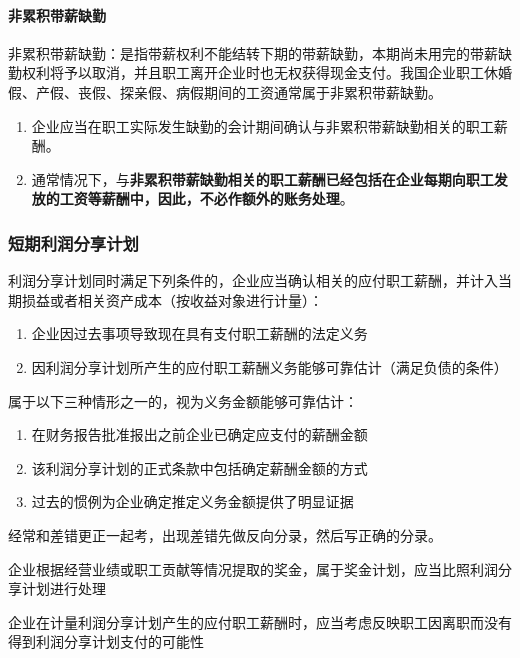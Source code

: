 \documentclass[UTF8,12pt]{ctexart}
\numberwithin{equation}{section} %
\numberwithin{figure}{section}
\numberwithin{table}{section}
\begin{document}
	\paragraph{非累积带薪缺勤}非累积带薪缺勤：是指带薪权利不能结转下期的带薪缺勤，本期尚未用完的带薪缺勤权利将予以取消，并且职工离开企业时也无权获得现金支付。我国企业职工休婚假、产假、丧假、探亲假、病假期间的工资通常属于非累积带薪缺勤。
	
	\begin{enumerate}
		\item 企业应当在职工实际发生缺勤的会计期间确认与非累积带薪缺勤相关的职工薪酬。
		
		\item 通常情况下，与\textbf{非累积带薪缺勤相关的职工薪酬已经包括在企业每期向职工发放的工资等薪酬中，因此，不必作额外的账务处理}。
	\end{enumerate}

	
	\subsubsection{短期利润分享计划}
	利润分享计划同时满足下列条件的，企业应当确认相关的应付职工薪酬，并计入当期损益或者相关资产成本（按收益对象进行计量）：
	\begin{enumerate}
		\item 企业因过去事项导致现在具有支付职工薪酬的法定义务
		
		\item 因利润分享计划所产生的应付职工薪酬义务能够可靠估计（满足负债的条件）
	\end{enumerate}
	
	属于以下三种情形之一的，视为义务金额能够可靠估计：
	\begin{enumerate}
		\item 在财务报告批准报出之前企业已确定应支付的薪酬金额
		
		\item 该利润分享计划的正式条款中包括确定薪酬金额的方式
		
		\item 过去的惯例为企业确定推定义务金额提供了明显证据
	\end{enumerate}

	经常和差错更正一起考，出现差错先做反向分录，然后写正确的分录。
	
	企业根据经营业绩或职工贡献等情况提取的奖金，属于奖金计划，应当比照利润分享计划进行处理
	
	企业在计量利润分享计划产生的应付职工薪酬时，应当考虑反映职工因离职而没有得到利润分享计划支付的可能性
	
\end{document}

